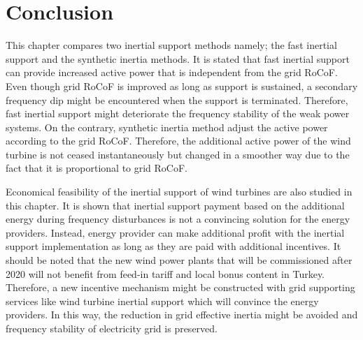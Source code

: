 \section{Conclusion}
This chapter compares two inertial support methods namely; the fast inertial support and the synthetic inertia methods. It is stated that fast inertial support can provide increased active power that is independent from the grid RoCoF. Even though grid RoCoF is improved as long as support is sustained, a secondary frequency dip might be encountered when the support is terminated. Therefore, fast inertial support might deteriorate the frequency stability of the weak power systems. On the contrary, synthetic inertia method adjust the active power according to the grid RoCoF. Therefore, the additional active power of the wind turbine is not ceased instantaneously but changed in a smoother way due to the fact that it is proportional to grid RoCoF.\par
Economical feasibility of the inertial support of wind turbines are also studied in this chapter. It is shown that inertial support payment based on the additional energy during frequency disturbances is not a convincing solution for the energy providers. Instead, energy provider can make additional profit with the inertial support implementation as long as they are paid with additional incentives. It should be noted that the new wind power plants that will be commissioned after 2020 will not benefit from feed-in tariff and local bonus content in Turkey. Therefore, a new incentive mechanism might be constructed with grid supporting services like wind turbine inertial support which will convince the energy providers. In this way, the reduction in grid effective inertia might be avoided and frequency stability of electricity grid is preserved.